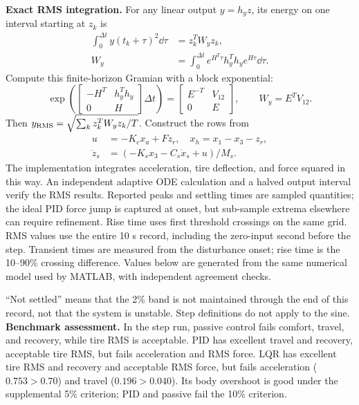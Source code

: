 \textbf{Exact RMS integration.} For any linear output $y=h_yz$, its energy on one
interval starting at $z_k$ is
\begin{align}
 \int_0^{\Delta t}y(t_k+\tau)^2\dd\tau
 &=z_k^TW_yz_k,\\
 W_y&=\int_0^{\Delta t}e^{H^T\tau}h_y^Th_y e^{H\tau}\dd\tau.
\end{align}
Compute this finite-horizon Gramian with a block exponential:
\begin{equation}
 \exp\left(\begin{bmatrix}-H^T&h_y^Th_y\\0&H\end{bmatrix}\Delta t\right)
 =\begin{bmatrix}E^{-T}&V_{12}\\0&E\end{bmatrix},\qquad W_y=E^TV_{12}.
\end{equation}
Then $y_{\mathrm{RMS}}=\sqrt{\sum_k z_k^TW_yz_k/T}$. Construct the rows from
\begin{align}
 u&=-K_cx_a+Fz_r,\quad x_h=x_1-x_3-z_r,\\
 \ddot z_s&=(-K_sx_3-C_s\dot x_s+u)/M_s.
\end{align}
The implementation integrates acceleration, tire deflection, and force squared
in this way. An independent adaptive ODE calculation and a halved output interval
verify the RMS results. Reported peaks and settling times are sampled quantities;
the ideal PID force jump is captured at onset, but sub-sample extrema elsewhere
can require refinement. Rise time uses first threshold crossings on the same grid.
\newpage
{}
RMS values use the entire 10 s record, including the zero-input second before the
step. Transient times are measured from the disturbance onset; rise time is the
10--90\% crossing difference. Values below are generated from the same numerical
model used by MATLAB, with independent agreement checks.

``Not settled'' means that the 2\% band is not maintained through the end of this
record, not that the system is unstable. Step definitions do not apply to the sine.
\textbf{Benchmark assessment.} In the step run, passive control fails comfort,
travel, and recovery, while tire RMS is acceptable. PID has excellent travel and
recovery, acceptable tire RMS, but fails acceleration and RMS force. LQR has
excellent tire RMS and recovery and acceptable RMS force, but fails acceleration
($0.753>0.70$) and travel ($0.196>0.040$). Its body overshoot is good under the
supplemental 5\% criterion; PID and passive fail the 10\% criterion.

